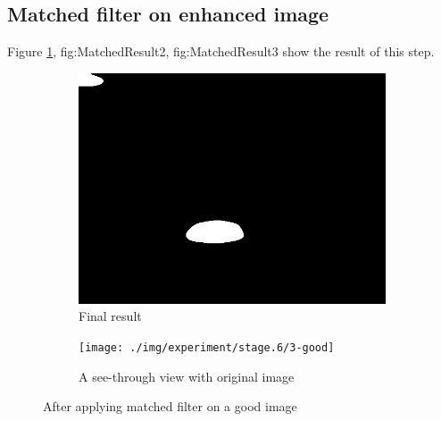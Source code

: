 \subsection{Matched filter on enhanced image}
Figure \ref{fig:MatchedResult1}, {fig:MatchedResult2}, {fig:MatchedResult3} show the result of this step.

\begin{figure}
\begin{subfigure}{0.5\textwidth}
    \centering
    \includegraphics[width=0.9\linewidth]{./img/experiment/stage.6/good}
    \caption{Final result}
\end{subfigure}
\begin{subfigure}{0.5\textwidth}
    \centering
    \texttt{[image: ./img/experiment/stage.6/3-good]}
    \caption{A see-through view with original image}
\end{subfigure}
\caption{After applying matched filter on a good image}
\label{fig:MatchedResult1}
\end{figure}


